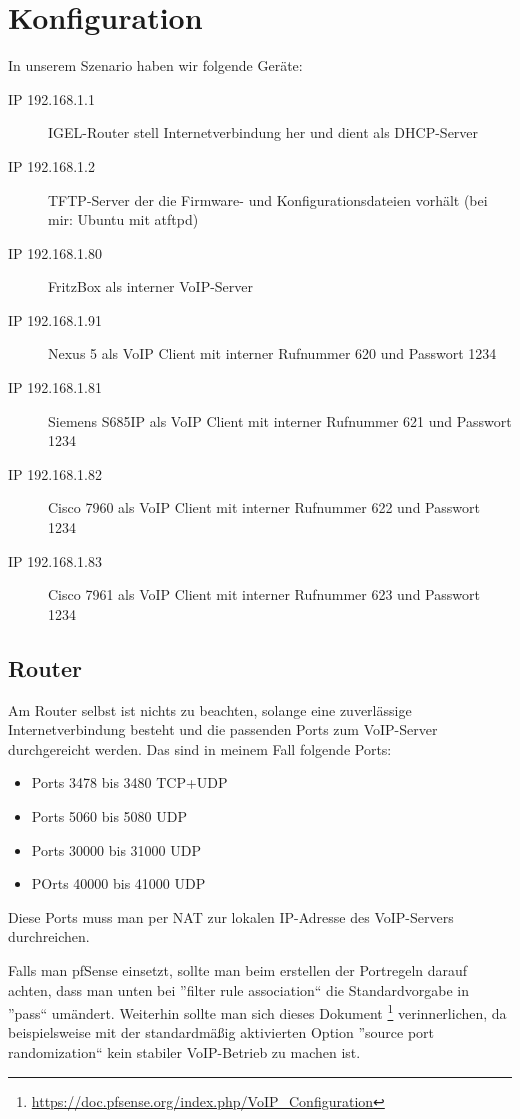 \documentclass[a4paper,12pt]{scrbook}
\begin{document}
\chapter{Konfiguration}
In unserem Szenario haben wir folgende Geräte:
\begin{description}
 \item[IP 192.168.1.1]  IGEL-Router stell Internetverbindung her und dient als DHCP-Server
 \item[IP 192.168.1.2]  TFTP-Server der die Firmware- und Konfigurationsdateien vorhält (bei mir: Ubuntu mit atftpd)
 \item[IP 192.168.1.80] FritzBox als interner VoIP-Server
 \item[IP 192.168.1.91] Nexus 5 als VoIP Client mit interner Rufnummer 620 und Passwort 1234
 \item[IP 192.168.1.81] Siemens S685IP als VoIP Client mit interner Rufnummer 621 und Passwort 1234
 \item[IP 192.168.1.82] Cisco 7960 als VoIP Client mit interner Rufnummer 622 und Passwort 1234
 \item[IP 192.168.1.83] Cisco 7961 als VoIP Client mit interner Rufnummer 623 und Passwort 1234
\end{description}

\section{Router}
Am Router selbst ist nichts zu beachten, solange eine zuverlässige Internetverbindung besteht und die passenden Ports zum VoIP-Server durchgereicht werden.
Das sind in meinem Fall folgende Ports:
\begin{itemize}
 \item Ports 3478 bis 3480 TCP+UDP
 \item Ports 5060 bis 5080 UDP
 \item Ports 30000 bis 31000 UDP
 \item POrts 40000 bis 41000 UDP
\end{itemize}

Diese Ports muss man per NAT zur lokalen IP-Adresse des VoIP-Servers durchreichen.

Falls man pfSense einsetzt, sollte man beim erstellen der Portregeln darauf achten, dass man 
unten bei ''filter rule association`` die Standardvorgabe in ''pass`` umändert. Weiterhin sollte man sich
dieses Dokument \footnote{\url{https://doc.pfsense.org/index.php/VoIP_Configuration}} verinnerlichen, da
beispielsweise mit der standardmäßig aktivierten Option ''source port randomization`` kein stabiler VoIP-Betrieb 
zu machen ist.
\end{document}
